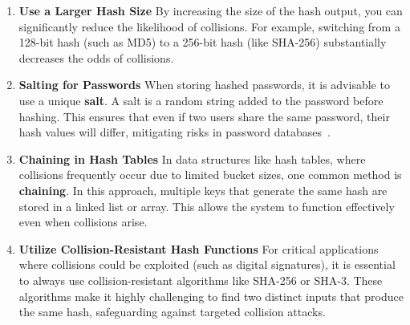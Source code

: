 \documentclass[11pt,a4paper]{article}
\begin{document}
        \begin{enumerate}
            \item \textbf{Use a Larger Hash Size}
            \newline
            By increasing the size of the hash output, you can significantly reduce the likelihood of collisions. For example, switching from a 128-bit hash (such as MD5) to a 256-bit hash (like SHA-256) substantially decreases the odds of collisions.

            \item \textbf{Salting for Passwords}
            \newline
            When storing hashed passwords, it is advisable to use a unique \textbf{salt}. A salt is a random string added to the password before hashing. This ensures that even if two users share the same password, their hash values will differ, mitigating risks in password databases~\cite{salt}.

            \item \textbf{Chaining in Hash Tables}
            \newline
            In data structures like hash tables, where collisions frequently occur due to limited bucket sizes, one common method is \textbf{chaining}. In this approach, multiple keys that generate the same hash are stored in a linked list or array. This allows the system to function effectively even when collisions arise.

            \item \textbf{Utilize Collision-Resistant Hash Functions}
            \newline
            For critical applications where collisions could be exploited (such as digital signatures), it is essential to always use collision-resistant algorithms like SHA-256 or SHA-3. These algorithms make it highly challenging to find two distinct inputs that produce the same hash, safeguarding against targeted collision attacks.

        \end{enumerate}
\end{document}
